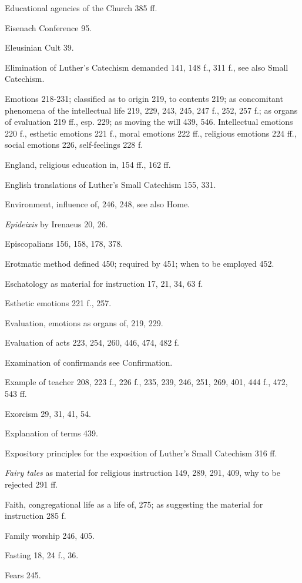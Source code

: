 Educational agencies of the Church 385 ff.

Eisenach Conference 95.

Eleusinian Cult 39.

Elimination of Luther’s Catechism demanded 141, 148 f., 311 f., see also Small Catechism.

Emotions 218-231; classified as to origin 219, to contents 219; as concomitant phenomena of the intellectual life 219, 229, 243, 245, 247 f., 252, 257 f.; as organs of evaluation 219 ff., esp. 229; as moving the will 439, 546. Intellectual emotions 220 f., esthetic emotions 221 f., moral emotions 222 ff., religious emotions 224 ff., social emotions 226, self-feelings 228 f.

England, religious education in, 154 ff., 162 ff.

English translations of Luther’s Small Catechism 155, 331.

Environment, influence of, 246, 248, see also Home.

\emph{Epideixis} by Irenaeus 20, 26.

Episcopalians 156, 158, 178, 378.

Erotmatic method defined 450; required by 451; when to be employed 452.

Eschatology as material for instruction 17, 21, 34, 63 f.

Esthetic emotions 221 f., 257.

Evaluation, emotions as organs of, 219, 229.

Evaluation of acts 223, 254, 260, 446, 474, 482 f.

Examination of confirmands see Confirmation.

Example of teacher 208, 223 f., 226 f., 235, 239, 246, 251, 269, 401, 444 f., 472, 543 ff.

Exorcism 29, 31, 41, 54.

Explanation of terms 439.

Expository principles for the exposition of Luther’s Small Catechism 316 ff.

\emph{Fairy tales} as material for religious instruction 149, 289, 291, 409, why to be rejected 291 ff.

Faith, congregational life as a life of, 275; as suggesting the material for instruction 285 f.

Family worship 246, 405.

Fasting 18, 24 f., 36.

Fears 245.

